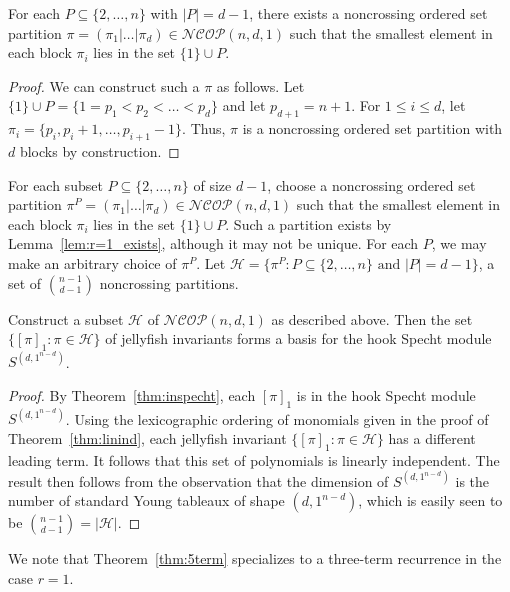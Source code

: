 \documentclass[ALCO, Unicode]{cedram}
\numberwithin{equation}{section}
\newcommand{\ncop}{\mathcal{NCOP}}
\begin{document}
\begin{lemma}\label{lem:r=1_exists}
For each $P\subseteq \{2,\ldots,n\}$ with $|P| = d-1$, there exists a noncrossing ordered set partition $\pi = (\pi_1| \dots | \pi_d) \in \ncop(n,d,1)$ such that the smallest element in each block $\pi_i$ lies in the set $\{1\}\cup P$.
\end{lemma}
\begin{proof}
We can construct such a $\pi$ as follows. Let $\{1\}\cup P = \{1 = p_1 < p_2 < \dots < p_d \}$ and let $p_{d+1} = n+1$. For $1 \leq i \leq d$, let $\pi_i = \{p_{i}, p_i + 1, \dots, p_{i+1} - 1 \}$. Thus, $\pi$ is a noncrossing ordered set partition with $d$ blocks by construction.
\end{proof}

For each subset $P \subseteq \{2,\ldots,n\}$ of size $d-1$, choose a noncrossing ordered set partition $\pi^P = (\pi_1 | \dots | \pi_d) \in \ncop(n,d,1)$ such that the smallest element in each block $\pi_i$ lies in the set $\{1\}\cup P$. Such a partition exists by Lemma~\ref{lem:r=1_exists}, although it may not be unique. For each $P$, we may make an arbitrary choice of $\pi^P$. Let $\mathcal{H}  = \{\pi^P : P \subseteq \{2,\ldots,n\} \text{ and } |P| = d-1 \}$, a set of $\binom{n-1}{d-1}$ noncrossing partitions.

\begin{theorem}\label{theorem:requals1}
Construct a subset $\mathcal{H}$ of $\ncop(n,d,1)$ as described above. Then the set $\{[\pi]_1 : \pi \in \mathcal{H}\}$ of jellyfish invariants forms a basis for the hook Specht module $S^{(d,1^{n-d})}$. 
\end{theorem}
\begin{proof}
By Theorem~\ref{thm:inspecht}, each $[\pi]_1$ is in the hook Specht module $S^{(d,1^{n-d})}$. Using the lexicographic ordering of monomials given in the proof of Theorem~\ref{thm:linind}, each jellyfish invariant $\{[\pi]_1 : \pi\in\mathcal{H}\}$ has a different leading term. It follows that this set of polynomials is linearly independent. The result then follows from the observation that the dimension of $S^{(d,1^{n-d})}$ is the number of standard Young tableaux of shape $(d,1^{n-d})$, which is easily seen to be $\binom{n-1}{d-1}=|\mathcal{H}|$.
\end{proof}

We note that Theorem~\ref{thm:5term} specializes to a three-term recurrence in the case $r=1$. 
\end{document}
